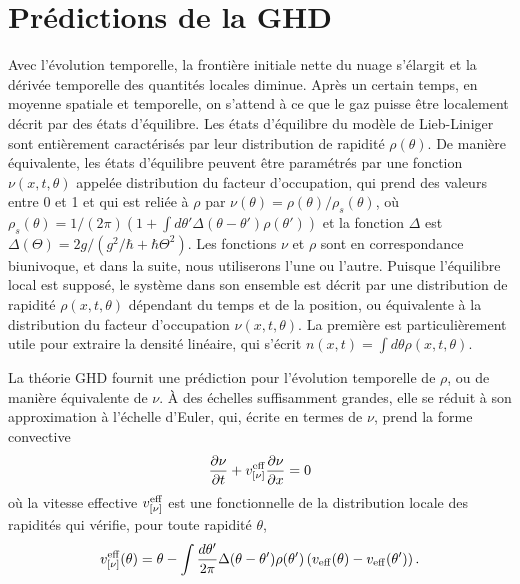 \documentclass[submission, Phys]{SciPost}
\begin{document}


{\color{blue}

\section*{Prédictions de la GHD}
Avec l'évolution temporelle, la frontière initiale nette du nuage s'élargit et la dérivée temporelle des quantités locales diminue. 
Après un certain temps, en moyenne spatiale et temporelle, on s'attend à ce que le gaz puisse être localement décrit par des états d'équilibre.
Les états d'équilibre du modèle de Lieb-Liniger sont entièrement caractérisés par leur distribution de rapidité $\rho(\theta)$.
De manière équivalente, les états d'équilibre peuvent être paramétrés par une fonction $\nu(x,t,\theta)$ appelée distribution du facteur d'occupation, qui prend des valeurs entre 0 et 1 et qui est reliée à 
$\rho$ par $\nu(\theta)=\rho(\theta)/\rho_s(\theta)$, où $\rho_s(\theta)=
1/(2\pi) \left (1+ \int d\theta' \Delta(\theta-\theta') \rho(\theta')\right )$
et la fonction $\Delta$ est $\Delta(\Theta)=2g/(g^2/\hbar+\hbar\Theta^2)$. 
Les fonctions $\nu$ et $\rho$ sont en correspondance biunivoque, et dans la suite, nous utiliserons l'une ou l'autre. 
Puisque l'équilibre local est supposé, le système dans son ensemble est décrit par une distribution de rapidité $\rho(x,t,\theta)$ dépendant du temps et de la position, ou équivalente à la distribution du facteur d'occupation $\nu(x,t,\theta)$. La première est particulièrement utile pour extraire la densité linéaire, qui s'écrit $n(x,t)=\int d\theta \rho(x,t,\theta)$.

La théorie GHD fournit une prédiction pour l'évolution temporelle de $\rho$, ou de manière équivalente de $\nu$. À des échelles suffisamment grandes, elle se réduit à son approximation à l'échelle d'Euler, qui, écrite en termes de $\nu$, prend la forme convective
\begin{equation}
\frac{\partial\nu}{\partial t} + v^{\rm{eff}}_{[\nu]}\frac{\partial  \nu }{\partial x} = 0
\end{equation}
où la vitesse effective $v^{\rm{eff}}_{[\nu]}$ est une fonctionnelle de la distribution locale des rapidités qui vérifie, pour toute rapidité $\theta$,
\[
v_{[\nu]}^{\rm{eff}}(\theta) = \theta -\int \frac{d\theta'}{2\pi} \Delta(\theta-\theta') \rho(\theta')\left (  v_{\rm{eff}}(\theta) - v_{\rm{eff}}(\theta') \right ).
\]

}
\end{document}
